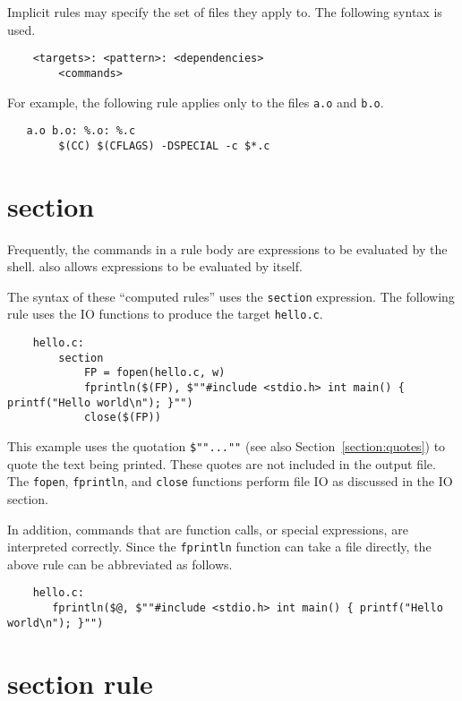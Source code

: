 Implicit rules may specify the set of files they apply to.  The following syntax is used.

\begin{verbatim}
    <targets>: <pattern>: <dependencies>
        <commands>
\end{verbatim}

For example, the following rule applies only to the files \verb+a.o+ and \verb+b.o+.

\begin{verbatim}
   a.o b.o: %.o: %.c
        $(CC) $(CFLAGS) -DSPECIAL -c $*.c
\end{verbatim}

\section{section}

Frequently, the commands in a rule body are expressions to be evaluated by the shell.  
also allows expressions to be evaluated by  itself.

The syntax of these ``computed rules'' uses the \verb+section+ expression.  The following rule uses
the  IO functions to produce the target \verb+hello.c+.

\begin{verbatim}
    hello.c:
        section
            FP = fopen(hello.c, w)
            fprintln($(FP), $""#include <stdio.h> int main() { printf("Hello world\n"); }"")
            close($(FP))
\end{verbatim}

This example uses the quotation \verb+$""...""+ (see also Section~\ref{section:quotes}) to quote the text being
printed.  These quotes are not included in the output file.  The \verb+fopen+, \verb+fprintln+, and
\verb+close+ functions perform file IO as discussed in the IO section.

In addition, commands that are function calls, or special expressions, are interpreted correctly.
Since the \verb+fprintln+ function can take a file directly, the above rule can be abbreviated as
follows.

\begin{verbatim}
    hello.c:
       fprintln($@, $""#include <stdio.h> int main() { printf("Hello world\n"); }"")
\end{verbatim}

\section{section rule}

